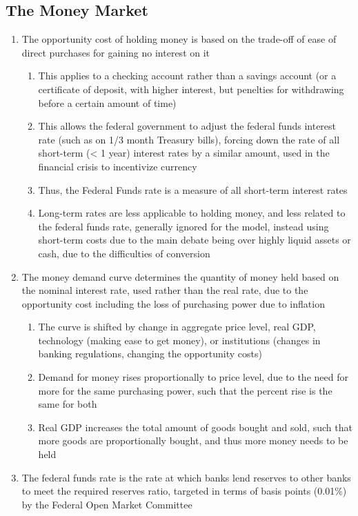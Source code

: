 \documentclass[11 pt, twoside]{article}
\begin{document}
\subsection{The Money Market}
\begin{enumerate}
\item The opportunity cost of holding money is based on the trade-off of ease of direct purchases for gaining no interest on it
\begin{enumerate}
\item This applies to a checking account rather than a savings account (or a certificate of deposit, with higher interest, but penelties for withdrawing before a certain amount of time)
\item This allows the federal government to adjust the federal funds interest rate (such as on 1/3 month Treasury bills), forcing down the rate of all short-term (< 1 year) interest rates by a similar amount, used in the financial crisis to incentivize currency
\item Thus, the Federal Funds rate is a measure of all short-term interest rates
\item Long-term rates are less applicable to holding money, and less related to the federal funds rate, generally ignored for the model, instead using short-term costs due to the main debate being over highly liquid assets or cash, due to the difficulties of conversion
\end{enumerate}
\item The money demand curve determines the quantity of money held based on the nominal interest rate, used rather than the real rate, due to the opportunity cost including the loss of purchasing power due to inflation
\begin{enumerate}
\item The curve is shifted by change in aggregate price level, real GDP, technology (making ease to get money), or institutions (changes in banking regulations, changing the opportunity costs)
\item Demand for money rises proportionally to price level, due to the need for more for the same purchasing power, such that the percent rise is the same for both
\item Real GDP increases the total amount of goods bought and sold, such that more goods are proportionally bought, and thus more money needs to be held
\end{enumerate}
\item The federal funds rate is the rate at which banks lend reserves to other banks to meet the required reserves ratio, targeted in terms of basis points (0.01\%) by the Federal Open Market Committee

\end{enumerate}
\end{document}
